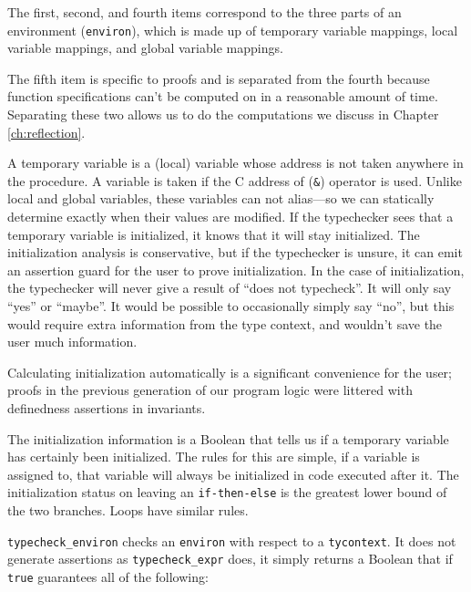 \documentclass{puthesis}
\begin{document}
The first, second, and fourth items correspond to the three parts of
an environment (\lstinline|environ|), which is made up of temporary
variable mappings, local variable mappings, and global variable
mappings.

The fifth item is specific to proofs and is separated from the fourth
because function specifications can't be computed on in a reasonable
amount of time. Separating these two allows us to do the computations
we discuss in Chapter \ref{ch:reflection}. 

A temporary variable is a (local) variable whose address is not taken
anywhere in the procedure. A variable is taken if the C address of
(\lstinline|&|) operator is used. Unlike local and global variables, these
variables can not alias---so we can statically determine exactly when
their values are modified. If the typechecker sees that a temporary
variable is initialized, it knows that it will stay initialized. The
initialization analysis is conservative, but if the typechecker is
unsure, it can emit an assertion guard for the user to prove
initialization. In the case of initialization, the typechecker will
never give a result of ``does not typecheck''. It will only say
``yes'' or ``maybe''. It would be possible to occasionally simply say
``no'', but this would require extra information from the type
context, and wouldn't save the user much information. 


Calculating initialization automatically is a significant convenience
for the user; proofs in the previous generation of our program logic
were littered with definedness assertions in invariants.

The initialization information is a Boolean that tells us if a
temporary variable has certainly been initialized. The rules for this
are simple, if a variable is assigned to, that variable will always be
initialized in code executed after it.  The initialization status on
leaving an \lstinline|if-then-else| is the greatest lower bound of the
two branches. Loops have similar rules.


\lstinline|typecheck_environ| checks an \lstinline|environ| with
respect to a \lstinline|tycontext|.  It does not generate assertions
as \lstinline|typecheck_expr| does, it simply returns a Boolean that
if \lstinline{true} guarantees all of the following:
\end{document}
